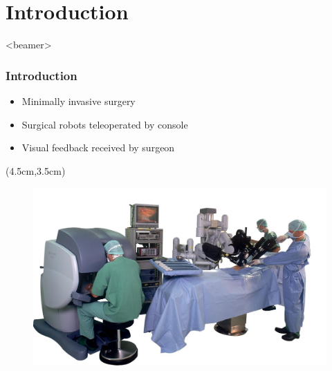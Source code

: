 \section{Introduction}
\begin{frame}<beamer>
\frametitle{Introduction}
\begin{itemize}
\item Minimally invasive surgery 
\item Surgical robots teleoperated by console

\item Visual feedback received by surgeon
\end{itemize}

\begin{textblock*}{0.7\textwidth}(4.5cm,3.5cm) %
	\begin{figure}[H]
		\centering
		\centering
		\includegraphics[width=1\textwidth]{Billeder/Dan/davinci.jpg}
	\end{figure}
\end{textblock*}

\end{frame}

